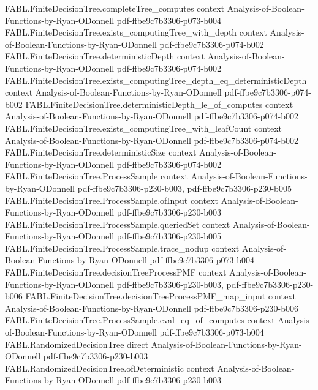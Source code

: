 \begin{theorem}
\proofstep
  {FABL.FiniteDecisionTree.completeTree_computes}
  {context}
  {Analysis-of-Boolean-Functions-by-Ryan-ODonnell}
  {pdf-ffbe9c7b3306-p073-b004}
\proofstep
  {FABL.FiniteDecisionTree.exists_computingTree_with_depth}
  {context}
  {Analysis-of-Boolean-Functions-by-Ryan-ODonnell}
  {pdf-ffbe9c7b3306-p074-b002}
\proofstep
  {FABL.FiniteDecisionTree.deterministicDepth}
  {context}
  {Analysis-of-Boolean-Functions-by-Ryan-ODonnell}
  {pdf-ffbe9c7b3306-p074-b002}
\proofstep
  {FABL.FiniteDecisionTree.exists_computingTree_depth_eq_deterministicDepth}
  {context}
  {Analysis-of-Boolean-Functions-by-Ryan-ODonnell}
  {pdf-ffbe9c7b3306-p074-b002}
\proofstep
  {FABL.FiniteDecisionTree.deterministicDepth_le_of_computes}
  {context}
  {Analysis-of-Boolean-Functions-by-Ryan-ODonnell}
  {pdf-ffbe9c7b3306-p074-b002}
\proofstep
  {FABL.FiniteDecisionTree.exists_computingTree_with_leafCount}
  {context}
  {Analysis-of-Boolean-Functions-by-Ryan-ODonnell}
  {pdf-ffbe9c7b3306-p074-b002}
\proofstep
  {FABL.FiniteDecisionTree.deterministicSize}
  {context}
  {Analysis-of-Boolean-Functions-by-Ryan-ODonnell}
  {pdf-ffbe9c7b3306-p074-b002}
\proofstep
  {FABL.FiniteDecisionTree.ProcessSample}
  {context}
  {Analysis-of-Boolean-Functions-by-Ryan-ODonnell}
  {pdf-ffbe9c7b3306-p230-b003,
    pdf-ffbe9c7b3306-p230-b005}
\proofstep
  {FABL.FiniteDecisionTree.ProcessSample.ofInput}
  {context}
  {Analysis-of-Boolean-Functions-by-Ryan-ODonnell}
  {pdf-ffbe9c7b3306-p230-b003}
\proofstep
  {FABL.FiniteDecisionTree.ProcessSample.queriedSet}
  {context}
  {Analysis-of-Boolean-Functions-by-Ryan-ODonnell}
  {pdf-ffbe9c7b3306-p230-b005}
\proofstep
  {FABL.FiniteDecisionTree.ProcessSample.trace_nodup}
  {context}
  {Analysis-of-Boolean-Functions-by-Ryan-ODonnell}
  {pdf-ffbe9c7b3306-p073-b004}
\proofstep
  {FABL.FiniteDecisionTree.decisionTreeProcessPMF}
  {context}
  {Analysis-of-Boolean-Functions-by-Ryan-ODonnell}
  {pdf-ffbe9c7b3306-p230-b003,
    pdf-ffbe9c7b3306-p230-b006}
\proofstep
  {FABL.FiniteDecisionTree.decisionTreeProcessPMF_map_input}
  {context}
  {Analysis-of-Boolean-Functions-by-Ryan-ODonnell}
  {pdf-ffbe9c7b3306-p230-b006}
\proofstep
  {FABL.FiniteDecisionTree.ProcessSample.eval_eq_of_computes}
  {context}
  {Analysis-of-Boolean-Functions-by-Ryan-ODonnell}
  {pdf-ffbe9c7b3306-p073-b004}
\proofstep
  {FABL.RandomizedDecisionTree}
  {direct}
  {Analysis-of-Boolean-Functions-by-Ryan-ODonnell}
  {pdf-ffbe9c7b3306-p230-b003}
\proofstep
  {FABL.RandomizedDecisionTree.ofDeterministic}
  {context}
  {Analysis-of-Boolean-Functions-by-Ryan-ODonnell}
  {pdf-ffbe9c7b3306-p230-b003}

\end{theorem}
